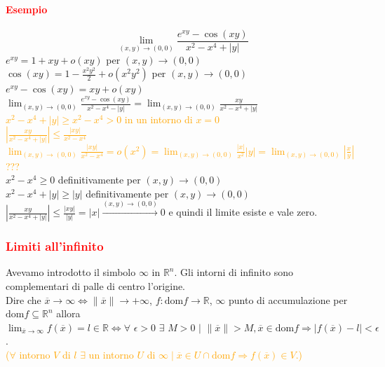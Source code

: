\documentclass{article}
\newcommand{\R}{\mathbb{R}}
\newcommand{\dom}{\text{dom}}
\begin{document}
\paragraph{\textcolor{red}{Esempio}}
\begin{equation*}
    \lim_{(x,y)\rightarrow(0,0)}\frac{e^{xy}-\cos(xy)}{x^2-x^4+|y|}
\end{equation*}
$e^{xy}=1+xy+o(xy)$ per $(x,y)\rightarrow(0,0)$\\
$\cos(xy)=1-\frac{x^2y^2}{2}+o(x^2y^2)$ per $(x,y)\rightarrow(0,0)$\\
$e^{xy}-\cos(xy)=xy+o(xy)$\\
$\lim_{(x,y)\rightarrow(0,0)}\frac{e^{xy}-\cos(xy)}{x^2-x^4-|y|}=\lim_{(x,y)\rightarrow(0,0)}\frac{xy}{x^2-x^4+|y|}$\\
\textcolor{orange}{$x^2-x^4+|y|\geq x^2-x^4>0$ in un intorno di $x=0$\\
$|\frac{xy}{x^2-x^4+|y|}|\leq \frac{|xy|}{x^2-x^4}$\\
$\lim_{(x,y)\rightarrow(0,0)}\frac{|xy|}{x^2-x^4}=o(x^2)=\lim_{(x,y)\rightarrow(0,0)} \frac{|x|}{x^2}|y|=\lim_{(x,y)\rightarrow(0,0)} |\frac{x}{y}|$???}\\
$x^2-x^4 \geq 0$ definitivamente per $(x,y)\rightarrow(0,0)$\\
$x^2-x^4+|y|\geq |y|$ definitivamente per $(x,y)\rightarrow(0,0)$\\
$|\frac{xy}{x^2-x^4+|y|}|\leq \frac{|xy|}{|y|}=|x|\xrightarrow{(x,y)\rightarrow(0,0)} 0$ e quindi il limite esiste e vale zero.

\subsubsection{\textcolor{red}{Limiti all'infinito}}
Avevamo introdotto il simbolo  $\infty$ in $\R^n$. Gli intorni di infinito sono complementari di palle di centro l'origine.\\
Dire che $\overline{x} \rightarrow \infty \Leftrightarrow \|\overline{x}\|\rightarrow +\infty$, $f:\dom f\rightarrow\R$, $\infty$ punto di accumulazione per $\dom f \subseteq \R^n$ allora $\lim_{\overline{x}\rightarrow \infty} f(\overline{x})=l\in \R \Leftrightarrow \forall \,\, \epsilon >0 \,\, \exists\,\, M >0 \,\, |\,\, \|\overline{x}\|>M, \overline{x}\in \dom f \Rightarrow |f(\overline{x})-l|<\epsilon$.\\
\textcolor{orange}{($\forall$ intorno $V$ di $l$ $\exists$ un intorno $U$ di $\infty \mid \overline{x}\in U \cap \dom f\Rightarrow f(\overline{x})\in V$.)}
\end{document}
